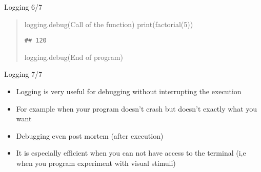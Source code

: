 \documentclass[
  8pt,
  ignorenonframetext,
]{beamer}
\newenvironment{Shaded}{\begin{snugshade}}{\end{snugshade}}
\newcommand{\BuiltInTok}[1]{#1}
\newcommand{\DecValTok}[1]{\textcolor[rgb]{0.00,0.00,0.81}{#1}}
\newcommand{\NormalTok}[1]{#1}
\newcommand{\StringTok}[1]{\textcolor[rgb]{0.31,0.60,0.02}{#1}}
\begin{document}
\begin{frame}[fragile]{Logging 6/7}
\begin{quote}
\begin{Shaded}
\begin{Highlighting}[]
\NormalTok{logging.debug(}\StringTok{\textquotesingle{}Call of the function\textquotesingle{}}\NormalTok{)}
\BuiltInTok{print}\NormalTok{(factorial(}\DecValTok{5}\NormalTok{))}
\end{Highlighting}
\end{Shaded}

\begin{verbatim}
## 120
\end{verbatim}

\begin{Shaded}
\begin{Highlighting}[]
\NormalTok{logging.debug(}\StringTok{\textquotesingle{}End of program\textquotesingle{}}\NormalTok{)}
\end{Highlighting}
\end{Shaded}
\end{quote}
\end{frame}

\begin{frame}{Logging 7/7}
\protect\hypertarget{logging-77}{}
\begin{itemize}
\item
  Logging is very useful for debugging without interrupting the
  execution
\item
  For example when your program doesn't crash but doesn't exactly what
  you want
\item
  Debugging even post mortem (after execution)
\item
  It is especially efficient when you can not have access to the
  terminal (i,e when you program experiment with visual stimuli)
\end{itemize}
\end{frame}
\end{document}
